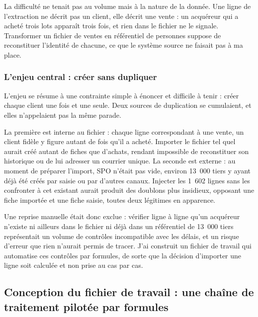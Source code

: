 La difficulté ne tenait pas au volume mais à la nature de la donnée. Une ligne de l'extraction
ne décrit pas un client, elle décrit une vente : un acquéreur qui a acheté trois lots apparaît
trois fois, et rien dans le fichier ne le signale. Transformer un fichier de ventes en
référentiel de personnes suppose de reconstituer l'identité de chacune, ce que le système
source ne faisait pas à ma place.

\hypertarget{lenjeu-central-cruxe9er-sans-dupliquer}{%
\subsubsection{L'enjeu central : créer sans dupliquer}\label{lenjeu-central-cruxe9er-sans-dupliquer}}

L'enjeu se résume à une contrainte simple à énoncer et difficile à tenir : créer chaque client
une fois et une seule. Deux sources de duplication se cumulaient, et elles n'appelaient pas la
même parade.

La première est interne au fichier : chaque ligne correspondant à une vente, un client fidèle
y figure autant de fois qu'il a acheté. Importer le fichier tel quel aurait créé autant de
fiches que d'achats, rendant impossible de reconstituer son historique ou de lui adresser un
courrier unique. La seconde est externe : au moment de préparer l'import, SPO n'était pas vide,
environ 13~000 tiers y ayant déjà été créés par saisie ou par d'autres canaux. Injecter les
1~602 lignes sans les confronter à cet existant aurait produit des doublons plus insidieux,
opposant une fiche importée et une fiche saisie, toutes deux légitimes en apparence.

Une reprise manuelle était donc exclue : vérifier ligne à ligne qu'un acquéreur n'existe ni
ailleurs dans le fichier ni déjà dans un référentiel de 13~000 tiers représentait un volume de
contrôles incompatible avec les délais, et un risque d'erreur que rien n'aurait permis de
tracer. J'ai construit un fichier de travail qui automatise ces contrôles par formules, de
sorte que la décision d'importer une ligne soit calculée et non prise au cas par cas.

\hypertarget{conception-du-fichier-de-travail-une-chauxeene-de-traitement-pilotuxe9e-par-formules}{%
\subsection{Conception du fichier de travail : une chaîne de traitement pilotée par formules}\label{conception-du-fichier-de-travail-une-chauxeene-de-traitement-pilotuxe9e-par-formules}}


